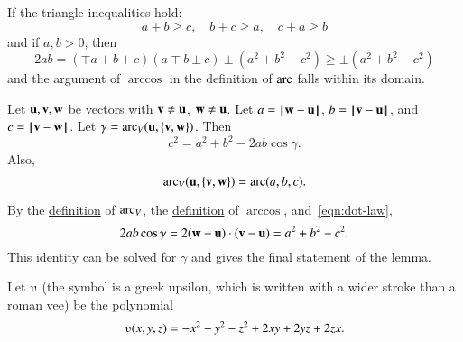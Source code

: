 If the triangle inequalities hold:
\begin{displaymath}
a + b \ge c,\quad b + c \ge a, \quad c+a \ge b
\end{displaymath}
and if $a,b >0$, then
\begin{displaymath}
  2 a b = (\mp a+b+c)(a \mp b \pm c) \pm (a^2 + b^2 - c^2) 
\ge \pm  (a^2 + b^2 - c^2)
\end{displaymath}
and the argument of $\arccos$ in the definition of $\operatorname{arc}$ falls within
its domain.

\begin{lemma}\label{lemma:loc}
Let ${\mathbf u},{\mathbf v},{\mathbf w}$ be vectors with ${\mathbf v}\ne {\mathbf u}$, ${\mathbf w}\ne {\mathbf u}$.  Let $a
= \norm{\w }{ \u}$, $b = \norm{\v }{ \u}$, and $c = \norm{\v }{ \w}$.
Let $\gamma=\operatorname{arc}_V({\mathbf u},\{{\mathbf v},{\mathbf w}\})$.    Then
\begin{displaymath}c^2 = a^2 + b^2 - 2 a b \cos\gamma.\end{displaymath}
Also,
\begin{displaymath}
\operatorname{arc}_V({\mathbf u},\{{\mathbf v},{\mathbf w}\})= \operatorname{arc}(a,b,c).
\end{displaymath}

\end{lemma}
%
%
%
%

\begin{proved}
By the \hyperref[def:angle]{definition} of $\operatorname{arc}_V$, the
\hyperref[def:arccos]{definition} of $\arccos$, and~\eqref{eqn:dot-law},
\begin{displaymath}
2 a b \cos \gamma = 2 ({\mathbf w} - {\mathbf u})\cdot ({\mathbf v} - {\mathbf u}) = a^2 + b^2 - c^2.
\end{displaymath}
This identity can be \hyperref[def:arccos]{solved} for $\gamma$ and
 gives the final statement of the lemma.  \swallowed\end{proved}


\begin{definition}[$\ups$]\label{def:ups}
Let $\ups$ (the symbol is a greek upsilon, which is written with a
wider stroke than a roman vee) be the polynomial
\begin{displaymath}\ups(x,y,z) = -x^2 - y^2 - z^2 + 2 x y + 2 y z + 2
  z x.\end{displaymath}
%
\end{definition}



